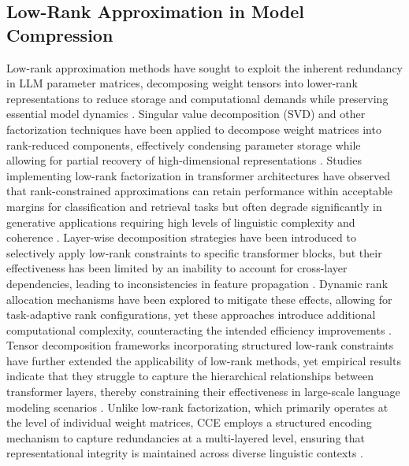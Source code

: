 \subsection{Low-Rank Approximation in Model Compression}
Low-rank approximation methods have sought to exploit the inherent redundancy in LLM parameter matrices, decomposing weight tensors into lower-rank representations to reduce storage and computational demands while preserving essential model dynamics \cite{durheum2024semantic}. Singular value decomposition (SVD) and other factorization techniques have been applied to decompose weight matrices into rank-reduced components, effectively condensing parameter storage while allowing for partial recovery of high-dimensional representations \cite{mcintosh2024inadequacy}. Studies implementing low-rank factorization in transformer architectures have observed that rank-constrained approximations can retain performance within acceptable margins for classification and retrieval tasks but often degrade significantly in generative applications requiring high levels of linguistic complexity and coherence \cite{whitbeck2024evaluating}. Layer-wise decomposition strategies have been introduced to selectively apply low-rank constraints to specific transformer blocks, but their effectiveness has been limited by an inability to account for cross-layer dependencies, leading to inconsistencies in feature propagation \cite{torrington2024adaptive}. Dynamic rank allocation mechanisms have been explored to mitigate these effects, allowing for task-adaptive rank configurations, yet these approaches introduce additional computational complexity, counteracting the intended efficiency improvements \cite{helms2024emergent}. Tensor decomposition frameworks incorporating structured low-rank constraints have further extended the applicability of low-rank methods, yet empirical results indicate that they struggle to capture the hierarchical relationships between transformer layers, thereby constraining their effectiveness in large-scale language modeling scenarios \cite{atox2024evaluating}. Unlike low-rank factorization, which primarily operates at the level of individual weight matrices, CCE employs a structured encoding mechanism to capture redundancies at a multi-layered level, ensuring that representational integrity is maintained across diverse linguistic contexts \cite{whitney2024adaptive}.

